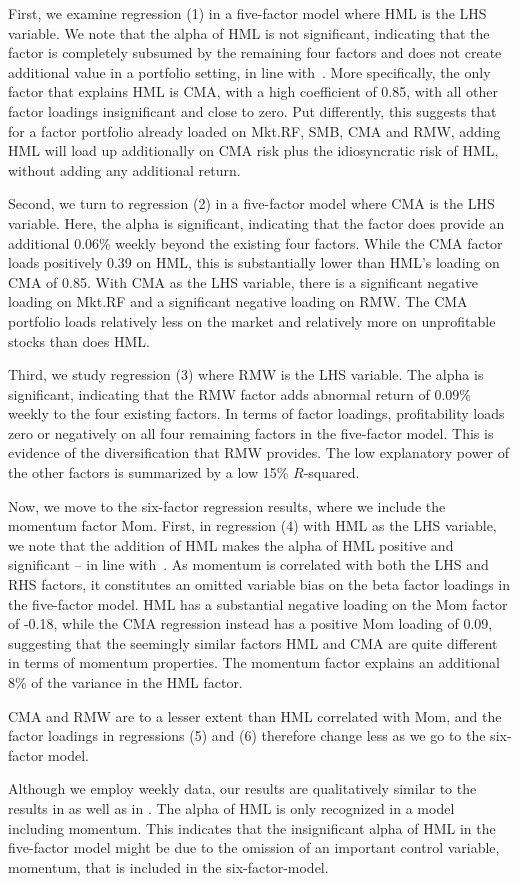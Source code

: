 First, we examine regression (1) in a five-factor model where HML is the LHS variable. We note that the alpha of HML is not significant, indicating that the factor is completely subsumed by the remaining four factors and does not create additional value in a portfolio setting, in line with~\textcite{FF2015}. More specifically, the only factor that explains HML is CMA, with a high coefficient of 0.85, with all other factor loadings insignificant and close to zero. Put differently, this suggests that for a factor portfolio already loaded on Mkt.RF, SMB, CMA and RMW, adding HML will load up additionally on CMA risk plus the idiosyncratic risk of HML, without adding any additional return.

Second, we turn to regression (2) in a five-factor model where CMA is the LHS variable. Here, the alpha is significant, indicating that the factor does provide an additional 0.06\% weekly beyond the existing four factors. While the CMA factor loads positively 0.39 on HML, this is substantially lower than HML's loading on CMA of 0.85. With CMA as the LHS variable, there is a significant negative loading on Mkt.RF and a significant negative loading on RMW. The CMA portfolio loads relatively less on the market and relatively more on unprofitable stocks than does HML.

Third, we study regression (3) where RMW is the LHS variable. The alpha is significant, indicating that the RMW factor adds abnormal return of 0.09\% weekly to the four existing factors. In terms of factor loadings, profitability loads zero or negatively on all four remaining factors in the five-factor model. This is evidence of the diversification that RMW provides. The low explanatory power of the other factors is summarized by a low 15\% $R$-squared.



Now, we move to the six-factor regression results, where we include the momentum factor Mom. First, in regression (4) with HML as the LHS variable, we note that the addition of HML makes the alpha of HML positive and significant -- in line with~\textcite{Asness2015}. As momentum is correlated with both the LHS and RHS factors, it constitutes an omitted variable bias on the beta factor loadings in the five-factor model. HML has a substantial negative loading on the Mom factor of -0.18, while the CMA regression instead has a positive Mom loading of 0.09, suggesting that the seemingly similar factors HML and CMA are quite different in terms of momentum properties. The momentum factor explains an additional 8\% of the variance in the HML factor. 

CMA and RMW are to a lesser extent than HML correlated with Mom, and the factor loadings in regressions (5) and (6) therefore change less as we go to the six-factor model.

Although we employ weekly data, our results are qualitatively similar to the results in \textcite{FF2015} as well as in \textcite{Asness2015}. The alpha of HML is only recognized in a model including momentum. This indicates that the insignificant alpha of HML in the five-factor model might be due to the omission of an important control variable, momentum, that is included in the six-factor-model.


